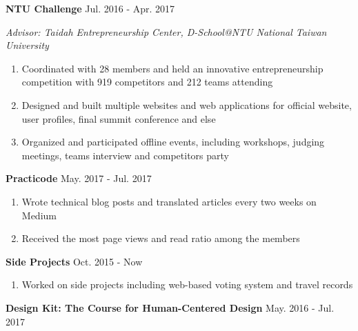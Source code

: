 \documentclass[12pt]{article}
\begin{document}
	\textbf{NTU Challenge} \hfill Jul. 2016 - Apr. 2017

	\textit{Advisor: Taidah Entrepreneurship Center, D-School@NTU \hfill National Taiwan University}

	\begin{enumerate}

		\item Coordinated with 28 members and held an innovative entrepreneurship competition with 919 competitors and 212 teams attending

		\item Designed and built multiple websites and web applications for official website, user profiles, final summit conference and else

		\item Organized and participated offline events, including workshops, judging meetings, teams interview and competitors party

	\end{enumerate}

	\vspace{0.5em}

	\textbf{Practicode} \hfill May. 2017 - Jul. 2017

	\begin{enumerate}

		\item Wrote technical blog posts and translated articles every two weeks on Medium

		\item Received the most page views and read ratio among the members

	\end{enumerate}

	\vspace{0.5em}

	\textbf{Side Projects} \hfill Oct. 2015 - Now

	\begin{enumerate}

		\item Worked on side projects including web-based voting system and travel records

	\end{enumerate}

	\vspace{0.5em}

	\textbf{Design Kit: The Course for Human-Centered Design} \hfill May. 2016 - Jul. 2017
\end{document}
